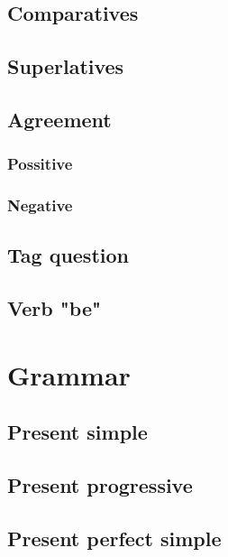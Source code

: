 \documentclass[12pt,openany]{book}
\begin{document}
	\section{Comparatives}

	\section{Superlatives}

	\section{Agreement}

		\subsection{Possitive}

		\subsection{Negative}

	\section{Tag question}

	\section{Verb "be"}


\chapter{Grammar}

	\section{Present simple}

	\section{Present progressive}

	\section{Present perfect simple}
\end{document}
